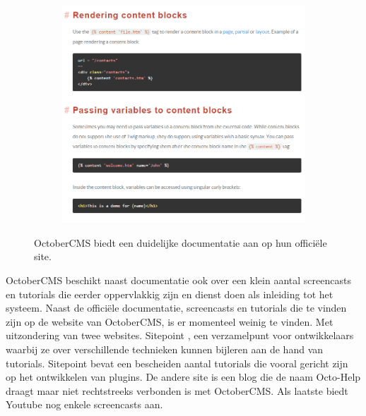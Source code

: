 \begin{figure}[!ht]
\begin{subfigure}[b]{0.20\textwidth}
  \centering
  \label{fig:OctoberCMS documentatie over navigatie}
\end{subfigure}
 \hfill
\begin{subfigure}[b]{0.70\textwidth}
 \includegraphics[width=\textwidth]{img/oc-documentation.png}
 \centering
  \label{fig:OctoberCMS documentatie detailpagina}
\end{subfigure}
 
\caption{OctoberCMS biedt een duidelijke documentatie aan op hun officiële site.}
\label{fig:OctoberCMS documentatie}
\end{figure}

\noindent
OctoberCMS beschikt naast documentatie ook over een klein aantal screencasts en tutorials \citep{OctoberCMS2016OctoberCMSRESOURCES} die eerder oppervlakkig zijn en dienst doen als inleiding tot het systeem. Naast de officiële documentatie, screencasts en tutorials die te vinden zijn op de website van OctoberCMS, is er momenteel weinig te vinden. Met uitzondering van twee websites. Sitepoint \citep{SitePoint2016SitePointTutorials}, een verzamelpunt voor ontwikkelaars waarbij ze over verschillende technieken kunnen bijleren aan de hand van tutorials. Sitepoint bevat een bescheiden aantal tutorials die vooral gericht zijn op het ontwikkelen van plugins. De andere site is een blog die de naam Octo-Help \citep{PacurarFilip2015Octo-Help} draagt maar niet rechtstreeks verbonden is met OctoberCMS. Als laatste biedt Youtube nog enkele screencasts aan.

